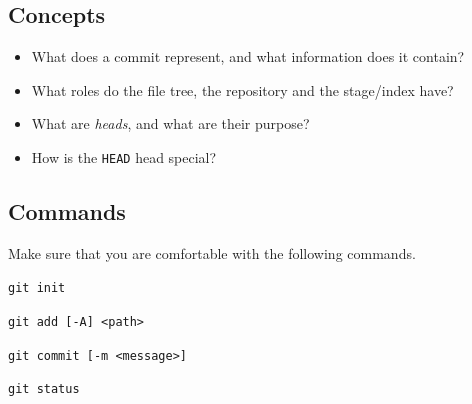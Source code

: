 \documentclass[../main/git_course_main.tex]{subfiles}
\begin{document}
	\subsection{Concepts}
	
	\begin{itemize}
		\item What does a commit represent, and what information does it contain?
		\item What roles do the file tree, the repository and the stage/index have?
		\item What are \textit{heads}, and what are their purpose?
		\item How is the \verb$HEAD$ head special?
	\end{itemize}
	
	\subsection{Commands}
	
	Make sure that you are comfortable with the following commands.
	
	\begin{description}
		\item \verb$git init$
		\item \verb$git add [-A] <path>$
		\item \verb$git commit [-m <message>]$
		\item \verb$git status$
	\end{description}
	
\end{document}
